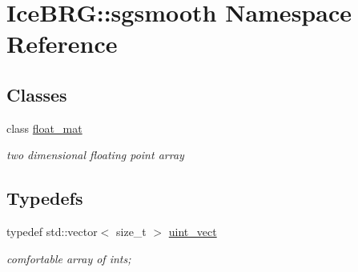 \hypertarget{namespaceIceBRG_1_1sgsmooth}{}\section{Ice\+B\+R\+G\+:\+:sgsmooth Namespace Reference}
\label{namespaceIceBRG_1_1sgsmooth}
\subsection*{Classes}
\begin{DoxyCompactItemize}
\item 
class \hyperlink{classIceBRG_1_1sgsmooth_1_1float__mat}{float\+\_\+mat}
\begin{DoxyCompactList}\small\item\em two dimensional floating point array \end{DoxyCompactList}\end{DoxyCompactItemize}
\subsection*{Typedefs}
\begin{DoxyCompactItemize}
\item 
typedef std\+::vector$<$ size\+\_\+t $>$ \hyperlink{namespaceIceBRG_1_1sgsmooth_ad7ed0983e4da9c1babc83f2da0a17c51}{uint\+\_\+vect}
\begin{DoxyCompactList}\small\item\em comfortable array of ints; \end{DoxyCompactList}\end{DoxyCompactItemize}
